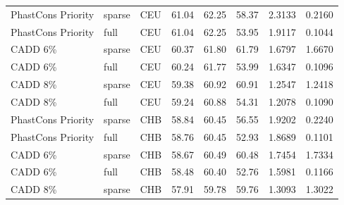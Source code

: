 \documentclass[11pt]{article}
\begin{document}
\begin{table}
\begin{tabular}{lll|crr|cc}
PhastCons Priority &            sparse &          CEU &                        61.04 &             62.25 &            58.37 &                                 2.3133 &                                0.2160 \\
PhastCons Priority &              full &          CEU &                        61.04 &             62.25 &            53.95 &                                 1.9117 &                                0.1044 \\
          CADD 6\% &            sparse &          CEU &                        60.37 &             61.80 &            61.79 &                                 1.6797 &                                1.6670 \\
          CADD 6\% &              full &          CEU &                        60.24 &             61.77 &            53.99 &                                 1.6347 &                                0.1096 \\
          CADD 8\% &            sparse &          CEU &                        59.38 &             60.92 &            60.91 &                                 1.2547 &                                1.2418 \\
          CADD 8\% &              full &          CEU &                        59.24 &             60.88 &            54.31 &                                 1.2078 &                                0.1090 \\
PhastCons Priority &            sparse &          CHB &                        58.84 &             60.45 &            56.55 &                                 1.9202 &                                0.2240 \\
PhastCons Priority &              full &          CHB &                        58.76 &             60.45 &            52.93 &                                 1.8689 &                                0.1101 \\
          CADD 6\% &            sparse &          CHB &                        58.67 &             60.49 &            60.48 &                                 1.7454 &                                1.7334 \\
          CADD 6\% &              full &          CHB &                        58.48 &             60.40 &            52.76 &                                 1.5981 &                                0.1166 \\
          CADD 8\% &            sparse &          CHB &                        57.91 &             59.78 &            59.76 &                                 1.3093 &                                1.3022 \\

\end{tabular}
\end{table}
\end{document}
